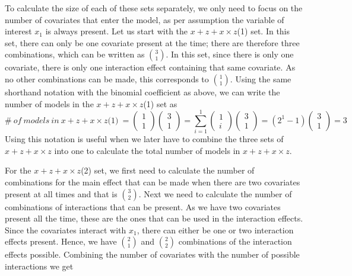 To calculate the size of each of these sets separately, we only need to focus on the number of covariates that enter the model, as per assumption the variable of interest $x_1$ is always present. Let us start with the $x + z + x \times z$(1) set. In this set, there can only be one covariate present at the time; there are therefore three combinations, which can be written as $\binom{3}{1}$. In this set, since there is only one covariate, there is only one interaction effect containing that same covariate. As no other combinations can be made, this corresponds to $\binom{1}{1}$. Using the same shorthand notation with the binomial coefficient as above, we can write the number of models in the $x + z + x \times z$(1) set as
\[\#\ of\ models\ in\ x + z + x \times z\textit{(1)}\ =\left( \begin{array}{c}
1 \\ 
1 \end{array}
\right)\left( \begin{array}{c}
3 \\ 
1 \end{array}
\right)=\sum^1_{i=1}{\left( \begin{array}{c}
1 \\ 
i \end{array}
\right)}\left( \begin{array}{c}
3 \\ 
1 \end{array}
\right)=\left(2^1-1\right)\left( \begin{array}{c}
3 \\ 
1 \end{array}
\right)=3\] 
Using this notation is useful when we later have to combine the three sets of $x + z + x \times z$ into one to calculate the total number of models in $x + z + x \times z$.

For the $x + z + x \times z$(2) set, we first need to calculate the number of combinations for the main effect that can be made when there are two covariates present at all times and that is $\binom{3}{2}$. Next we need to calculate the number of combinations of interactions that can be present. As we have two covariates present all the time, these are the ones that can be used in the interaction effects. Since the covariates interact with $x_1$, there can either be one or two interaction effects present. Hence, we have $\binom{2}{1}$ and $\binom{2}{2}$ combinations of the interaction effects possible. Combining the number of covariates with the number of possible interactions we get

